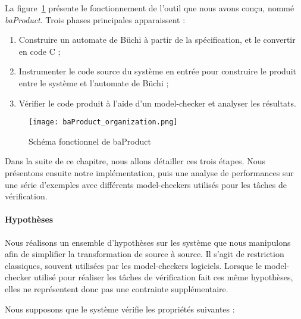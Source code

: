 La figure~\ref{fig:baProduct_func} présente le fonctionnement de l'outil que
nous avons conçu, nommé \emph{baProduct}. Trois phases principales
apparaissent :

\begin{enumerate}
\def\labelenumi{\arabic{enumi})}
  \item Construire un automate de Büchi à partir de la spécification, et le
    convertir en code C ;
  \item Instrumenter le code source du système en entrée pour construire le
    produit entre le système et l'automate de Büchi ;
  \item Vérifier le code produit à l'aide d'un model-checker et analyser les
    résultats.
\end{enumerate}

\begin{figure}
\begin{center}
  \texttt{[image: baProduct\_organization.png]}
\end{center}
\caption{Schéma fonctionnel de baProduct}
\label{fig:baProduct_func}
\end{figure}

Dans la suite de ce chapitre, nous allons détailler ces trois étapes. Nous
présentons ensuite notre implémentation, puis une analyse de performances
sur une série d'exemples avec différents model-checkers utilisés pour les tâches
de vérification.

\paragraph{Hypothèses}
Nous réalisons un ensemble d'hypothèses sur les système
que nous manipulons afin de simplifier la transformation de source à source. Il
s'agit de restriction classiques, souvent utilisées par les model-checkers
logiciels. Lorsque le model-checker utilisé pour réaliser les tâches de
vérification fait ces même hypothèses, elles ne représentent donc pas une
contrainte supplémentaire.

Nous supposons que le système vérifie les propriétés suivantes :

